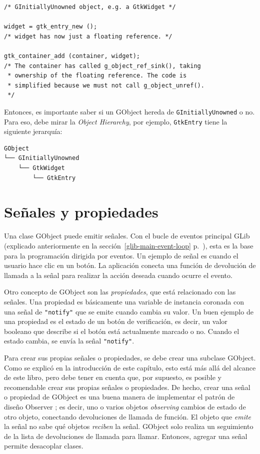 \begin{lstlisting}[float=p, caption={Gestión de memoria de GObjects derivados de \lstinline{GInitiallyUnowned}.}, label=oop-gobject-mem-management-floating]
/* GInitiallyUnowned object, e.g. a GtkWidget */

widget = gtk_entry_new ();
/* widget has now just a floating reference. */

gtk_container_add (container, widget);
/* The container has called g_object_ref_sink(), taking
 * ownership of the floating reference. The code is
 * simplified because we must not call g_object_unref().
 */
\end{lstlisting}

Entonces, es importante saber si un GObject hereda de \lstinline{GInitiallyUnowned} o no. Para eso, debe mirar la \emph{Object Hierarchy}, por ejemplo, \lstinline{GtkEntry} tiene la siguiente jerarquía:

\begin{verbatim}
GObject
└── GInitiallyUnowned
    └── GtkWidget
        └── GtkEntry
\end{verbatim}

\section{Señales y propiedades}
\label{oop-gobject-signals-and-properties}

Una clase GObject puede emitir señales. Con el bucle de eventos principal GLib (explicado anteriormente en la sección~\ref{glib-main-event-loop} p.~\pageref{glib-main-event-loop}), esta es la base para la programación dirigida por eventos. Un ejemplo de señal es cuando el usuario hace clic en un botón. La aplicación conecta una función de devolución de llamada a la señal para realizar la acción deseada cuando ocurre el evento.

Otro concepto de GObject son las \emph{propiedades}, que está relacionado con las señales. Una propiedad es básicamente una variable de instancia coronada con una señal de \lstinline{"notify"} que se emite cuando cambia su valor. Un buen ejemplo de una propiedad es el estado de un botón de verificación, es decir, un valor booleano que describe si el botón está actualmente marcado o no. Cuando el estado cambia, se envía la señal \lstinline{"notify"}.

Para crear sus propias señales o propiedades, se debe crear una subclase GObject. Como se explicó en la introducción de este capítulo, esto está más allá del alcance de este libro, pero debe tener en cuenta que, por supuesto, es posible y recomendable crear sus propias señales o propiedades. De hecho, crear una señal o propiedad de GObject es una buena manera de implementar el patrón de diseño Observer \cite{design-patterns-book}; es decir, uno o varios objetos \emph{observing} cambios de estado de otro objeto, conectando devoluciones de llamada de función. El objeto que \emph{emite} la señal no sabe qué objetos \emph{reciben} la señal. GObject solo realiza un seguimiento de la lista de devoluciones de llamada para llamar. Entonces, agregar una señal permite desacoplar clases.

